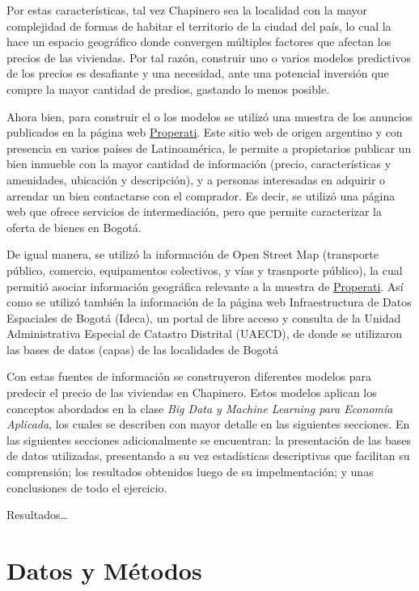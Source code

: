 \documentclass[
  11pt,
  letterpaper,
]{article}
\begin{document}
Por estas características, tal vez Chapinero sea la localidad con la mayor complejidad de formas de habitar el territorio de la ciudad del país, lo cual la hace un espacio geográfico donde convergen múltiples factores que afectan los precios de las viviendas. Por tal razón, construir uno o varios modelos predictivos de los precios es desafiante y una necesidad, ante una potencial inversión que compre la mayor cantidad de predios, gastando lo menos posible.

Ahora bien, para construir el o los modelos se utilizó una muestra de los anuncios publicados en la página web \href{ https://www.properati.com.co/}{Properati}. Este sitio web de origen argentino y con presencia en varios países de Latinoamérica, le permite a propietarios publicar un bien inmueble con la mayor cantidad de información (precio, características y amenidades, ubicación y descripción), y a personas interesadas en adquirir o arrendar un bien contactarse con el comprador. Es decir, se utilizó una página web que ofrece servicios de intermediación, pero que permite caracterizar la oferta de bienes en Bogotá.

De igual manera, se utilizó la información de Open Street Map (transporte público, comercio, equipamentos colectivos, y vías y trasnporte público), la cual permitió asociar información geográfica relevante a la muestra de \href{ https://www.properati.com.co/}{Properati}. Así como se utilizó también la información de la página web Infraestructura de Datos Espaciales de Bogotá (Ideca), un portal de libre acceso y consulta de la Unidad Administrativa Especial de Catastro Distrital (UAECD), de donde se utilizaron las bases de datos (capas) de las localidades de Bogotá

Con estas fuentes de información se construyeron diferentes modelos para predecir el precio de las viviendas en Chapinero. Estos modelos aplican los conceptos abordados en la clase \textit{Big Data y Machine Learning para Economía Aplicada}, los cuales se describen con mayor detalle en las siguientes secciones. En las siguientes secciones adicionalmente se encuentran: la presentación de las bases de datos utilizadas, presentando a su vez estadísticas descriptivas que facilitan su comprensión; los resultados obtenidos luego de su impelmentación; y unas conclusiones de todo el ejercicio.

Resultados\ldots{}

\hypertarget{datos-y-muxe9todos}{%
\section{Datos y Métodos}\label{datos-y-muxe9todos}}
\end{document}
